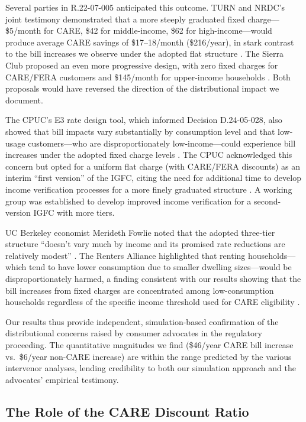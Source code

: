 \documentclass[12pt]{article}
\begin{document}
Several parties in R.22-07-005 anticipated this outcome. TURN and NRDC's joint testimony demonstrated that a more steeply graduated fixed charge---\$5/month for CARE, \$42 for middle-income, \$62 for high-income---would produce average CARE savings of \$17--18/month (\$216/year), in stark contrast to the bill increases we observe under the adopted flat structure \citep{NRDC_TURN_01, NRDC_TURN_02}. The Sierra Club proposed an even more progressive design, with zero fixed charges for CARE/FERA customers and \$145/month for upper-income households \citep{SierraClub_R2207005}. Both proposals would have reversed the direction of the distributional impact we document.

The CPUC's E3 rate design tool, which informed Decision D.24-05-028, also showed that bill impacts vary substantially by consumption level and that low-usage customers---who are disproportionately low-income---could experience bill increases under the adopted fixed charge levels \citep{E3_FixedChargeTool}. The CPUC acknowledged this concern but opted for a uniform flat charge (with CARE/FERA discounts) as an interim ``first version'' of the IGFC, citing the need for additional time to develop income verification processes for a more finely graduated structure \citep{CPUC_D2405028}. A working group was established to develop improved income verification for a second-version IGFC with more tiers.

UC Berkeley economist Merideth Fowlie noted that the adopted three-tier structure ``doesn't vary much by income and its promised rate reductions are relatively modest'' \citep{Fowlie2024}. The Renters Alliance highlighted that renting households---which tend to have lower consumption due to smaller dwelling sizes---would be disproportionately harmed, a finding consistent with our results showing that the bill increases from fixed charges are concentrated among low-consumption households regardless of the specific income threshold used for CARE eligibility \citep{RentersAlliance2024}.

Our results thus provide independent, simulation-based confirmation of the distributional concerns raised by consumer advocates in the regulatory proceeding. The quantitative magnitudes we find (\$46/year CARE bill increase vs.\ \$6/year non-CARE increase) are within the range predicted by the various intervenor analyses, lending credibility to both our simulation approach and the advocates' empirical testimony.

\subsection{The Role of the CARE Discount Ratio}
\label{sec:care_discount_ratio}
\end{document}

